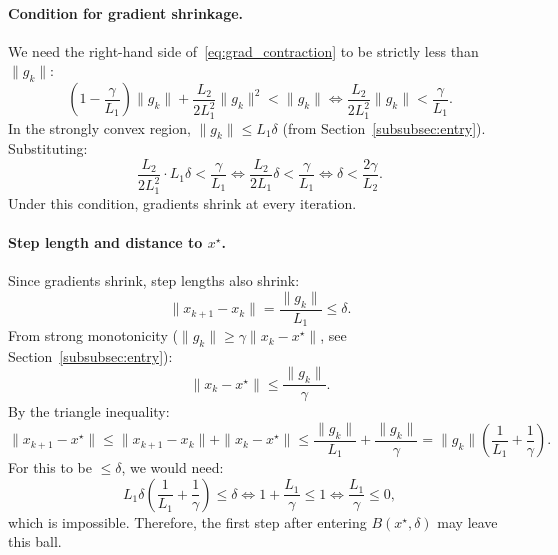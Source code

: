\documentclass{article}
\begin{document}
\paragraph{Condition for gradient shrinkage.} We need the right-hand side of~\eqref{eq:grad_contraction} to be strictly less than $\|g_k\|$:
\[
\left(1 - \frac{\gamma}{L_1}\right)\|g_k\| + \frac{L_2}{2L_1^2}\|g_k\|^2 < \|g_k\| \iff \frac{L_2}{2L_1^2}\|g_k\| < \frac{\gamma}{L_1}.
\]
In the strongly convex region, $\|g_k\| \leq L_1\delta$ (from Section~\ref{subsubsec:entry}). Substituting:
\[
\frac{L_2}{2L_1^2} \cdot L_1\delta < \frac{\gamma}{L_1} \iff \frac{L_2}{2L_1}\delta < \frac{\gamma}{L_1} \iff \delta < \frac{2\gamma}{L_2}.
\]
Under this condition, gradients shrink at every iteration.

\paragraph{Step length and distance to $x^\star$.} Since gradients shrink, step lengths also shrink:
\[
\|x_{k+1} - x_k\| = \frac{\|g_k\|}{L_1} \leq \delta.
\]
From strong monotonicity ($\|g_k\| \geq \gamma\|x_k - x^\star\|$, see Section~\ref{subsubsec:entry}):
\[
\|x_k - x^\star\| \leq \frac{\|g_k\|}{\gamma}.
\]
By the triangle inequality:
\[
\|x_{k+1} - x^\star\| \leq \|x_{k+1} - x_k\| + \|x_k - x^\star\| \leq \frac{\|g_k\|}{L_1} + \frac{\|g_k\|}{\gamma} = \|g_k\|\left(\frac{1}{L_1} + \frac{1}{\gamma}\right).
\]
For this to be $\leq \delta$, we would need:
\[
L_1\delta\left(\frac{1}{L_1} + \frac{1}{\gamma}\right) \leq \delta \iff 1 + \frac{L_1}{\gamma} \leq 1 \iff \frac{L_1}{\gamma} \leq 0,
\]
which is impossible. Therefore, the first step after entering $B(x^\star, \delta)$ may leave this ball.
\end{document}
